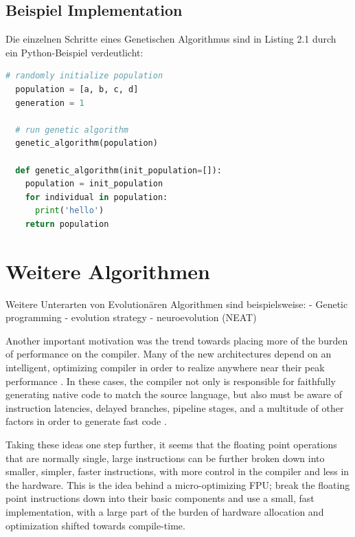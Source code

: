 \subsection{Beispiel Implementation}
Die einzelnen Schritte eines Genetischen Algorithmus sind in Listing 2.1 durch
ein Python-Beispiel verdeutlicht:

\begin{lstlisting}[language=Python, caption=Genetischer Algorithmus (Python)]
  # randomly initialize population
  population = [a, b, c, d]
  generation = 1

  # run genetic algorithm
  genetic_algorithm(population)

  def genetic_algorithm(init_population=[]):
    population = init_population
    for individual in population:
      print('hello')
    return population

\end{lstlisting}

\section{Weitere Algorithmen}

Weitere Unterarten von Evolutionären Algorithmen sind beispielsweise:
- Genetic programming
- evolution strategy
- neuroevolution (NEAT)




\newpage

Another important motivation was the trend towards placing more of the
burden of performance on the compiler.  Many of the new architectures depend
on an intelligent, optimizing compiler in order to realize anywhere near
their peak performance
\cite{ellis:bulldog,pet87,coutant:precision-compilers}.  In these cases, the
compiler not only is responsible for faithfully generating native code to
match the source language, but also must be aware of instruction latencies,
delayed branches, pipeline stages, and a multitude of other factors in order
to generate fast code \cite{gib86}.

Taking these ideas one step further, it seems that the floating point
operations that are normally single, large instructions can be further broken
down into smaller, simpler, faster instructions, with more control in the
compiler and less in the hardware.  This is the idea behind a
micro-optimizing FPU; break the floating point instructions down into their
basic components and use a small, fast implementation, with a large part of
the burden of hardware allocation and optimization shifted towards
compile-time.

